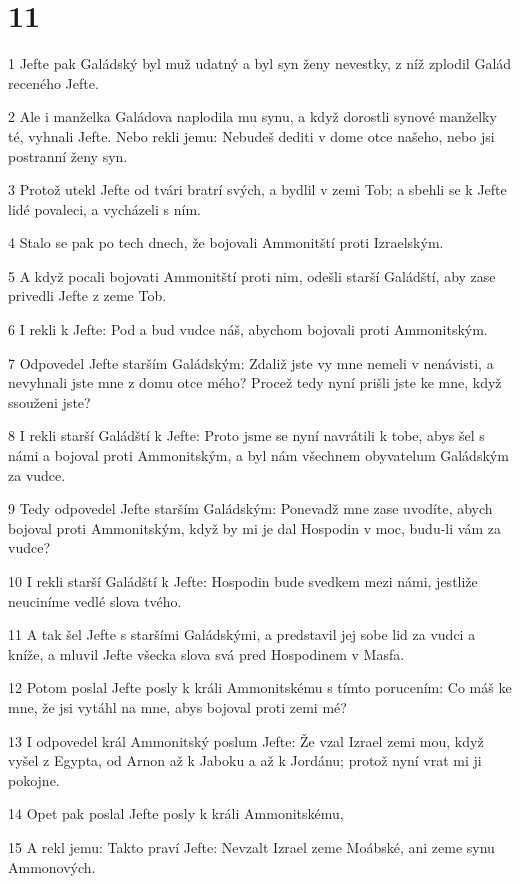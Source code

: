 \chapter{11}

\par 1 Jefte pak Galádský byl muž udatný a byl syn ženy nevestky, z níž zplodil Galád receného Jefte.
\par 2 Ale i manželka Galádova naplodila mu synu, a když dorostli synové manželky té, vyhnali Jefte. Nebo rekli jemu: Nebudeš dediti v dome otce našeho, nebo jsi postranní ženy syn.
\par 3 Protož utekl Jefte od tvári bratrí svých, a bydlil v zemi Tob; a sbehli se k Jefte lidé povaleci, a vycházeli s ním.
\par 4 Stalo se pak po tech dnech, že bojovali Ammonitští proti Izraelským.
\par 5 A když pocali bojovati Ammonitští proti nim, odešli starší Galádští, aby zase privedli Jefte z zeme Tob.
\par 6 I rekli k Jefte: Pod a bud vudce náš, abychom bojovali proti Ammonitským.
\par 7 Odpovedel Jefte starším Galádským: Zdaliž jste vy mne nemeli v nenávisti, a nevyhnali jste mne z domu otce mého? Procež tedy nyní prišli jste ke mne, když ssouženi jste?
\par 8 I rekli starší Galádští k Jefte: Proto jsme se nyní navrátili k tobe, abys šel s námi a bojoval proti Ammonitským, a byl nám všechnem obyvatelum Galádským za vudce.
\par 9 Tedy odpovedel Jefte starším Galádským: Ponevadž mne zase uvodíte, abych bojoval proti Ammonitským, když by mi je dal Hospodin v moc, budu-li vám za vudce?
\par 10 I rekli starší Galádští k Jefte: Hospodin bude svedkem mezi námi, jestliže neuciníme vedlé slova tvého.
\par 11 A tak šel Jefte s staršími Galádskými, a predstavil jej sobe lid za vudci a kníže, a mluvil Jefte všecka slova svá pred Hospodinem v Masfa.
\par 12 Potom poslal Jefte posly k králi Ammonitskému s tímto porucením: Co máš ke mne, že jsi vytáhl na mne, abys bojoval proti zemi mé?
\par 13 I odpovedel král Ammonitský poslum Jefte: Že vzal Izrael zemi mou, když vyšel z Egypta, od Arnon až k Jaboku a až k Jordánu; protož nyní vrat mi ji pokojne.
\par 14 Opet pak poslal Jefte posly k králi Ammonitskému,
\par 15 A rekl jemu: Takto praví Jefte: Nevzalt Izrael zeme Moábské, ani zeme synu Ammonových.
